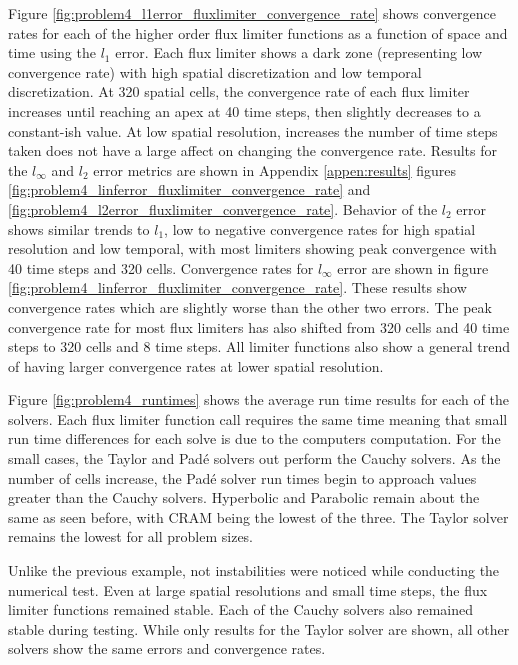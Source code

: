 Figure \ref{fig:problem4_l1error_fluxlimiter_convergence_rate} shows convergence rates for each of the higher order flux limiter functions as a function of space and time using the $l_{1}$ error. Each flux limiter shows a dark zone (representing low convergence rate) with high spatial discretization and low temporal discretization. At 320 spatial cells, the convergence rate of each flux limiter increases until reaching an apex at 40 time steps, then slightly decreases to a constant-ish value. At low spatial resolution, increases the number of time steps taken does not have a large affect on changing the convergence rate. Results for the $l_{\infty}$ and $l_{2}$ error metrics are shown in Appendix \ref{appen:results} figures \ref{fig:problem4_linferror_fluxlimiter_convergence_rate} and \ref{fig:problem4_l2error_fluxlimiter_convergence_rate}. Behavior of the $l_{2}$ error shows similar trends to $l_{1}$, low to negative convergence rates for high spatial resolution and low temporal, with most limiters showing peak convergence with 40 time steps and 320 cells. Convergence rates for $l_{\infty}$ error are shown in figure \ref{fig:problem4_linferror_fluxlimiter_convergence_rate}. These results show convergence rates which are slightly worse than the other two errors. The peak convergence rate for most flux limiters has also shifted from 320 cells and 40 time steps to 320 cells and 8 time steps. All limiter functions also show a general trend of having larger convergence rates at lower spatial resolution. 

Figure \ref{fig:problem4_runtimes} shows the average run time results for each of the solvers. Each flux limiter function call requires the same time meaning that small run time differences for each solve is due to the computers computation. For the small cases, the Taylor and Pad\'e solvers out perform the Cauchy solvers. As the number of cells increase, the Pad\'e solver run times begin to approach values greater than the Cauchy solvers. Hyperbolic and Parabolic remain about the same as seen before, with CRAM being the lowest of the three. The Taylor solver remains the lowest for all problem sizes. 

Unlike the previous example, not instabilities were noticed while conducting the numerical test. Even at large spatial resolutions and small time steps, the flux limiter functions remained stable. Each of the Cauchy solvers also remained stable during testing. While only results for the Taylor solver are shown, all other solvers show the same errors and convergence rates.

